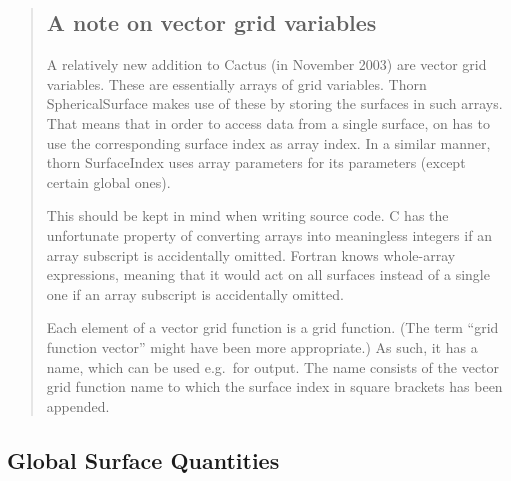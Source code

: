 \begin{quotation}
\subsection*{A note on vector grid variables}

A relatively new addition to Cactus (in November 2003) are vector grid
variables.  These are essentially arrays of grid variables.  Thorn
SphericalSurface makes use of these by storing the surfaces in such
arrays.  That means that in order to access data from a single
surface, on has to use the corresponding surface index as array index.
In a similar manner, thorn SurfaceIndex uses array parameters for its
parameters (except certain global ones).

This should be kept in mind when writing source code.  C has the
unfortunate property of converting arrays into meaningless integers if
an array subscript is accidentally omitted.  Fortran knows whole-array
expressions, meaning that it would act on all surfaces instead of a
single one if an array subscript is accidentally omitted.

Each element of a vector grid function is a grid function.  (The term
``grid function vector'' might have been more appropriate.)  As such,
it has a name, which can be used e.g.\ for output.  The name consists
of the vector grid function name to which the surface index in square
brackets has been appended.
\end{quotation}



\subsection{Global Surface Quantities}

